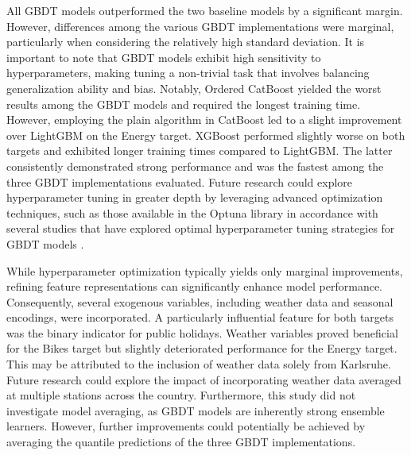 All GBDT models outperformed the two baseline models by a significant margin. However, differences among the various GBDT implementations were marginal, particularly when considering the relatively high standard deviation. It is important to note that GBDT models exhibit high sensitivity to hyperparameters, making tuning a non-trivial task that involves balancing generalization ability and bias. Notably, Ordered CatBoost yielded the worst results among the GBDT models and required the longest training time. However, employing the plain algorithm in CatBoost led to a slight improvement over LightGBM on the Energy target. 
XGBoost performed slightly worse on both targets and exhibited longer training times compared to LightGBM. The latter consistently demonstrated strong performance and was the fastest among the three GBDT implementations evaluated. Future research could explore hyperparameter tuning in greater depth by leveraging advanced optimization techniques, such as those available in the Optuna library \parencite{akiba_optuna_2019} in accordance with several studies that have explored optimal hyperparameter tuning strategies for GBDT models \parencites{florek_benchmarking_2023, bentejac_comparative_2021}.

While hyperparameter optimization typically yields only marginal improvements, refining feature representations can significantly enhance model performance. Consequently, several exogenous variables, including weather data and seasonal encodings, were incorporated. A particularly influential feature for both targets was the binary indicator for public holidays. Weather variables proved beneficial for the Bikes target but slightly deteriorated performance for the Energy target. This may be attributed to the inclusion of weather data solely from Karlsruhe. Future research could explore the impact of incorporating weather data averaged at multiple stations across the country. Furthermore, this study did not investigate model averaging, as GBDT models are inherently strong ensemble learners. However, further improvements could potentially be achieved by averaging the quantile predictions of the three GBDT implementations.


